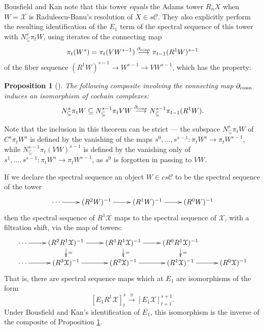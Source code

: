 \documentclass[11pt]{amsart} \renewcommand{\baselinestretch}{1.2}
\theoremstyle{plain}
\newtheorem{prop}[thm]{Proposition}
\theoremstyle{definition}
\renewcommand{\to}{\longrightarrow}
\newcommand{\calT}{\mathcal{T}}
\newcommand{\calK}{\mathcal{K}}
\newcommand{\calx}{\mathcal{X}}
\newcommand{\calc}{\mathcal{C}}
\newcommand{\citeBOX}[2][]{\cite[\mbox{#1}]{#2}}
\newcommand{\algcat}{{\calc}}%
\newcommand{\Edownup}[5]{[E_{#1}^{#2}#3]^{#4}_{#5}}
\newcommand{\Dendo}{R}
\begin{document}
\begin{Operations on the Bousfield-Kan spectral sequence}
Bousfield and Kan note \citeBOX[\S3.3 and \S4.2]{BK_pairings_products.pdf} that this tower \emph{equals} the Adams tower $R_nX$ when $W=\calx$ is Radulescu-Banu's resolution of $X\in s\algcat$. They also explicitly perform the resulting identification of the $E_1$ term of the spectral sequence of this tower with $N^s_\subseteq\pi_tW$, using iterates of the connecting map
\[\pi_t(W^{s})=\pi_t(VW^{s-1})\overset{\partial_\textup{conn} }{\to}\pi_{t-1}(\Dendo^1W)^{s-1}\]
of the fiber sequence $(\Dendo^1W)^{s-1}\to W^{s-1}\to VW^{s-1}$, which has the property:
\begin{prop}[{\cite[Proposition 5.2]{BK_pairings_products.pdf}}]
\label{BK D1 is awesome}
The following composite involving the connecting map $\partial_\textup{conn}$ induces an isomorphism of cochain complexes:
\[N^s_\subseteq \pi_t W\subseteq N^{s-1}_\subseteq \pi_t VW \overset{\partial_\textup{conn}}{\to}N^{s-1}_\subseteq \pi_{t-1} (\Dendo^1W).\]
\end{prop}
\noindent Note that the inclusion in this theorem can be strict --- the subspace $N^s_\subseteq \pi_t W$ of $C^s\pi_t W^s$ is defined by the vanishing of the maps $s^0,\ldots,s^{s-1}:\pi_t W^s\to \pi_t W^{s-1}$, while $ N^{s-1}_\subseteq \pi_t (VW)^{s-1}$ is defined by the vanishing only of $s^1,\ldots,s^{s-1}:\pi_t W^s\to \pi_t W^{s-1}$, as $s^0$ is forgotten in passing to $VW$.

If we declare the spectral sequence an object $W\in cs\algcat$ to be the spectral sequence of the tower
\[\xymatrix@R=4mm{
\cdots 
\ar[r]
&%
(\Dendo^2W)^{-1}
\ar[r]
&%
(\Dendo^1W)^{-1}
\ar[r]&%
(\Dendo^0W)^{-1}
}\]
then the spectral sequence of $\Dendo^1\calx$ maps to the spectral sequence of $\calx$, with a filtration shift, via the map of towers:
\[\xymatrix@R=4mm{
\cdots 
\ar[r]
&%
(\Dendo^2\Dendo^1\calx)^{-1}
\ar[r]\ar[d]^{=}
&%
(\Dendo^1\Dendo^1\calx)^{-1}
\ar[r]\ar[d]^{=}
&%
(\Dendo^0\Dendo^1\calx)^{-1}
\ar[d]^{=}
\\
\cdots 
\ar[r]
&%
(\Dendo^3\calx)^{-1}
\ar[r]
&%
(\Dendo^2\calx)^{-1}
\ar[r]
&%
(\Dendo^1\calx)^{-1}
\ar[r]&%
(\Dendo^0\calx)^{-1}
}\]
That is, there are spectral sequence maps which at $E_1$ are isomorphisms  of the form
\[\Edownup{1}{}{\Dendo^1\calx}{s}{t}\overset{\cong}{\to} \Edownup{1}{}{\calx}{s+1}{t+1}.\]
Under Bousfield and Kan's identification of $E_1$, this isomorphism is the inverse of the composite of Proposition \ref{BK D1 is awesome}.


\end{Operations on the Bousfield-Kan spectral sequence}
\end{document}
